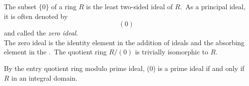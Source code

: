 \documentclass[12pt]{article}
\theoremstyle{definition}
\begin{document}
The subset $\{0\}$ of a ring $R$ is the least two-sided ideal of $R$.\, As a principal ideal, it is often denoted by
$$(0)$$
and called the {\em zero ideal}.\\

The zero ideal is the identity element in the addition of ideals and the absorbing element in the .\, The quotient ring $R/(0)$ is trivially isomorphic to $R$.

By the entry quotient ring modulo prime ideal, (0) is a prime ideal if and only if $R$ in an integral domain.

\end{document}
